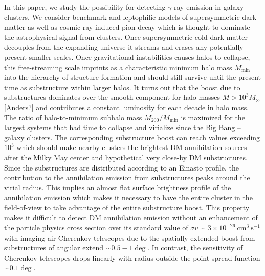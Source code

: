 \documentclass[10pt,aps,pra,reprint,amsmath,amsfonts,amssymb,showpacs]{revtex4-1}
\newcommand{\msun}{M_\odot}
\begin{document}
In this paper, we study the possibility for detecting $\gamma$-ray emission in
galaxy clusters. We consider benchmark and leptophilic models of supersymmetric
dark matter as well as cosmic ray induced pion decay which is thought to
dominate the astrophysical signal from clusters. Once supersymmetric cold dark
matter decouples from the expanding universe it streams and erases any
potentially present smaller scales. Once gravitational instabilities causes
halos to collapse, this free-streaming scale imprints as a characteristic
minimum halo mass $M_\mathrm{min}$ into the hierarchy of structure formation and
should still survive until the present time as substructure within larger
halos. It turns out that the boost due to substructures dominates over the
smooth component for halo masses $M>10^3 \msun$ [Anders?] and contributes a constant
luminosity for each decade in halo mass. The ratio of halo-to-minimum subhalo
mass $M_{200}/M_\mathrm{min}$ is maximized for the largest systems that had time
to collapse and virialize since the Big Bang -- galaxy clusters. The
corresponding substructure boost can reach values exceeding $10^3$ which should
make nearby clusters the brightest DM annihilation sources after the Milky May
center and hypothetical very close-by DM substructures. Since the substructures
are distributed according to an Einasto profile, the contribution to the
annihilation emission from substructures peaks around the virial radius. This
implies an almost flat surface brightness profile of the annihilation emission
which makes it necessary to have the entire cluster in the field-of-view to take
advantage of the entire substructure boost.  This property makes it difficult to
detect DM annihilation emission without an enhancement of the particle physics
cross section over its standard value of $\sigma v\sim 3\times 10^{-26}
~\mathrm{cm}^3~\mathrm{s}^{-1}$ with imaging air Cherenkov telescopes due to the
spatially extended boost from substructures of angular extend $\sim
0.5-1\deg$. In contrast, the sensitivity of Cherenkov telescopes drops linearly
with radius outside the point spread function $\sim0.1\deg$.
\end{document}
